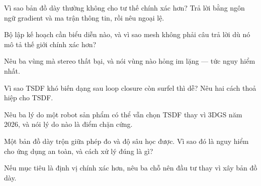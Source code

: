 \documentclass[../../vslam.tex]{subfiles}
\begin{document}
\begin{tukiem}
\item Vì sao bản đồ dày thường không cho tư thế chính xác hơn? Trả lời bằng ngôn ngữ gradient và ma trận thông tin, rồi nêu ngoại lệ.
\item Bộ lập kế hoạch cần biểu diễn nào, và vì sao mesh không phải câu trả lời dù nó mô tả thế giới chính xác hơn?
\item Nêu ba vùng mà stereo thất bại, và nói vùng nào hỏng im lặng --- tức nguy hiểm nhất.
\item Vì sao TSDF khó biến dạng sau loop closure còn surfel thì dễ? Nêu hai cách thoả hiệp cho TSDF.
\item Nêu ba lý do một robot sản phẩm có thể vẫn chọn TSDF thay vì 3DGS năm 2026, và nói lý do nào là điểm chặn cứng.
\item Một bản đồ dày trộn giữa phép đo và độ sâu học được. Vì sao đó là nguy hiểm cho ứng dụng an toàn, và cách xử lý đúng là gì?
\item Nếu mục tiêu là định vị chính xác hơn, nêu ba chỗ nên đầu tư thay vì xây bản đồ dày.
\end{tukiem}
\ifSubfilesClassLoaded{\printbibliography[title={Nguồn}]}{}
\end{document}
